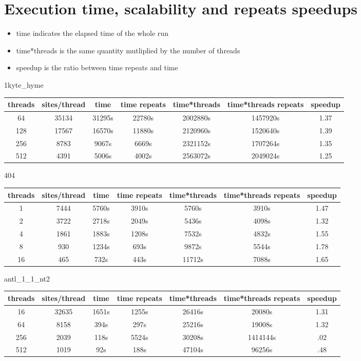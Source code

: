 \documentclass[a4paper]{article}
\begin{document}
\section{Execution time, scalability and repeats speedups}


\begin{itemize}
\item time indicates the elapsed time of the whole run
\item time*threads is the same quantity mutliplied by the number of threads
\item speedup is the ratio between time repeats and time
\end{itemize}


1kyte\_hyme

\begin{tabular}{|c|c|c|c|c|c|c|}
\hline threads & sites/thread & time & time repeats & time*threads & time*threads repeats & speedup \\
\hline 64 & 35134 & 31295s & 22780s & 2002880s & 1457920s & 1.37 \\
\hline 128 & 17567 & 16570s & 11880s & 2120960s & 1520640s & 1.39 \\
\hline 256 & 8783 & 9067s & 6669s & 2321152s & 1707264s & 1.35 \\
\hline 512 & 4391 & 5006s & 4002s & 2563072s & 2049024s & 1.25 \\
\hline
\end{tabular}
\newline

404

\begin{tabular}{|c|c|c|c|c|c|c|}
\hline threads & sites/thread & time & time repeats & time*threads & time*threads repeats & speedup \\
\hline 1 & 7444 & 5760s & 3910s & 5760s & 3910s & 1.47 \\
\hline 2 & 3722 & 2718s & 2049s & 5436s & 4098s & 1.32 \\
\hline 4 & 1861 & 1883s & 1208s & 7532s & 4832s & 1.55 \\
\hline 8 & 930 & 1234s & 693s & 9872s & 5544s & 1.78 \\
\hline 16 & 465 & 732s & 443s & 11712s & 7088s & 1.65 \\
\hline
\end{tabular}
\newline

antl\_1\_1\_nt2

\begin{tabular}{|c|c|c|c|c|c|c|}
\hline threads & sites/thread & time & time repeats & time*threads & time*threads repeats & speedup \\
\hline 16 & 32635 & 1651s & 1255s & 26416s & 20080s & 1.31 \\
\hline 64 & 8158 & 394s & 297s & 25216s & 19008s & 1.32 \\
\hline 256 & 2039 & 118s & 5524s & 30208s & 1414144s & .02 \\
\hline 512 & 1019 & 92s & 188s & 47104s & 96256s & .48 \\
\hline
\end{tabular}
\newline
\end{document}
